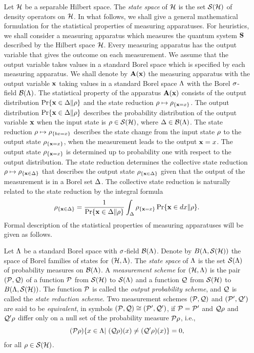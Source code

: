 Let ${\cal H}$ be a separable Hilbert space.
The {\em state space} of ${\cal H}$ is the set ${\cal S}({\cal H})$ of density operators
on ${\cal H}$.
In what follows, we shall give a general mathematical formulation for
the statistical properties of measuring apparatuses.
For heuristics, we shall consider a measuring apparatus which measures 
the quantum system ${\bf S}$ described by the Hilbert space ${\cal H}$.
Every measuring apparatus has the output variable that gives the outcome 
on each measurement.  We assume that the output
variable takes values in a standard Borel space which is specified by
each measuring apparatus.  We shall denote by ${\bf A}({\bf x})$ the  measuring
apparatus with the output variable ${\bf x}$ taking values in a standard
Borel space $\Lambda$ with the Borel $\sigma$-field ${\cal B}(\Lambda)$.
The statistical property of the apparatus ${\bf A}({\bf x})$ consists of
the output distribution $\Pr\{{\bf x}\in\Delta\|\rho\}$ and
the state reduction $\rho\mapsto\rho_{\{{\bf x}=x\}}$.
The output distribution $\Pr\{{\bf x}\in\Delta\|\rho\}$ 
describes the probability distribution of the output variable ${\bf x}$
when the input state is $\rho\in{\cal S}({\cal H})$, where $\Delta\in{\cal B}(\Lambda)$.
The state reduction $\rho\mapsto\rho_{\{bx=x\}}$ describes the state
change from the input state $\rho$ to the output state $\rho_{\{{\bf x}=x\}}$,
when the measurement leads to the output ${\bf x}=x$.  
The output
state $\rho_{\{{\bf x}=x\}}$ is determined up to probability one with
respect to the output distribution.  The state reduction determines
the collective state reduction $\rho\mapsto\rho_{\{{\bf x}\in\Delta\}}$ that
describes the output state $\rho_{\{{\bf x}\in\Delta\}}$ given that  
the output of the measurement is in a Borel set $\Delta$.  The collective
state reduction is naturally related to the state reduction by the
integral formula
$$
\rho_{\{{\bf x}\in\Delta\}}
=\frac{1}{\Pr\{{\bf x}\in\Delta\|\rho\}}
\int_{\Delta}\rho_{\{{\bf x}=x\}}\Pr\{{\bf x}\in dx\|\rho\}.
$$ 
Formal description of the statistical properties of measuring
apparatuses will be given as follows.

Let $\Lambda$ be a standard Borel space
with $\sigma$-field ${\cal B}(\Lambda)$.
Denote by $B(\Lambda,{\cal S}({\cal H}))$ the space of Borel families of
states for $({\cal H},\Lambda)$.
The {\em state space} of $\Lambda$ is the set ${\cal S}(\Lambda)$ of probability
measures on ${\cal B}(\Lambda)$.
A {\em measurement scheme} for $({\cal H},\Lambda)$ is the pair $({\cal P},{\cal Q})$ of
a function ${\cal P}$ from ${\cal S}({\cal H})$ to ${\cal S}(\Lambda)$ and a function ${\cal Q}$ 
from ${\cal S}({\cal H})$ to $B(\Lambda,{\cal S}({\cal H}))$.
The function ${\cal P}$ is called the {\em output probability scheme}, 
and ${\cal Q}$ is called the {\em state reduction scheme}.
Two measurement schemes $({\cal P},{\cal Q})$ and $({\cal P}',{\cal Q}')$ are said to be
{\em equivalent}, in symbols $({\cal P},{\cal Q})\cong({\cal P}',{\cal Q}')$, if ${\cal P}={\cal P}'$ and
${\cal Q}\rho$ and ${\cal Q}'\rho$
differ only on a null set of the probability measure ${\cal P}\rho$, i.e.,
$$
(\cP\rh)\{x\in\La|\ (\cQ\rh)(x)\not=(\cQ'\rh)(x)\}=0,
$$
for all $\rho\in{\cal S}({\cal H})$.

